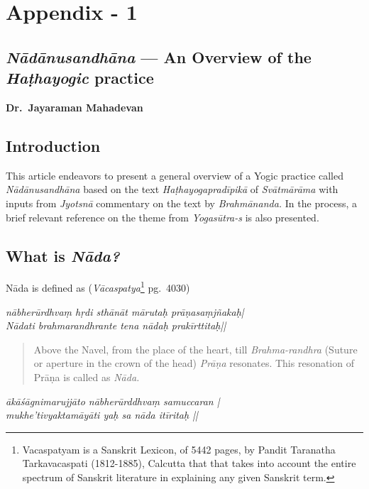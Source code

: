 \chapter{Appendix - 1}

\section*{\textit{Nādānusandhāna} --- An Overview of the \textit{Haṭhayogic} practice}

\centerline{\textbf{Dr.~Jayaraman Mahadevan}}

\section*{Introduction}

This article endeavors to present a general overview of a Yogic practice called \textit{Nādānusandhāna} based on the text \textit{Haṭhayogapradīpikā} of \textit{Svātmārāma} with inputs from \textit{Jyotsnā} commentary on the text by \textit{Brahmānanda.} In the process, a brief relevant reference on the theme from \textit{Yogasūtra-s} is also presented.

\section*{What is \textit{Nāda?}}

Nāda is defined as (\textit{Vācaspatya}\footnote{Vacaspatyam is a Sanskrit Lexicon, of 5442 pages, by Pandit Taranatha Tarkavacaspati (1812-1885), Calcutta that that takes into account the entire spectrum of Sanskrit literature in explaining any given Sanskrit term.} pg.~4030)

\begin{shloka}
\textit{nābherūrdhvaṃ hṛdi sthānāt mārutaḥ prāṇasaṃjñakaḥ|}\\
\textit{Nādati brahmarandhrante tena nādaḥ prakīrttitaḥ||}
\end{shloka}

\begin{quote}
Above the Navel, from the place of the heart, till \textit{Brahma-randhra} (Suture or aperture in the crown of the head) \textit{Prāṇa} resonates. This resonation of Prāṇa is called as \textit{Nāda.}
\end{quote}

\begin{shloka}
\textit{ākāśāgnimarujjāto nābherūrddhvaṃ samuccaran |}\\
\textit{mukhe'tivyaktamāyāti yaḥ sa nāda itīritaḥ ||}
\end{shloka}

